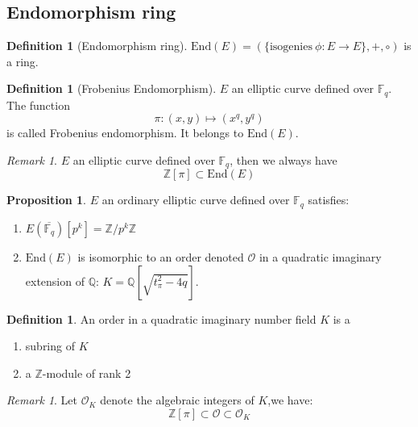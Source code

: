 \documentclass[10pt,a4paper]{beamer}
\theoremstyle{plain}
\theoremstyle{definition}
\theoremstyle{definition}
\theoremstyle{definition}
\newtheorem{prop}[thm]{Proposition}
\theoremstyle{definition}
\newtheorem{defi}[thm]{Definition}
\theoremstyle{remark}
\newtheorem{rem}[thm]{Remark}
\theoremstyle{remark}
\begin{document}
\begin{frame}
\section{Endomorphism ring}
\begin{defi}[Endomorphism ring]
$\mathrm{End}(E)=\left( \{ \mathrm{isogenies \  } \phi : E \rightarrow E \} ,+ ,\circ  \right)$ is a ring. %
\end{defi}

\begin{defi}[Frobenius Endomorphism]
$E$ an elliptic curve defined over $\mathbb{F}_q$. The function \[ \pi:(x,y) \mapsto (x^q,y^q)\] is called Frobenius endomorphism. It belongs to $\mathrm{End}(E)$.
\end{defi}

\begin{rem}
$E$ an elliptic curve defined over $\mathbb{F}_q$, then we always have \[ \mathbb{Z}[\pi] \subset  \mathrm{End}(E) \]
\end{rem}
\end{frame}


\begin{frame}
\begin{prop} \label{prop:p-tor}
$E$ an ordinary elliptic curve defined over $\mathbb{F}_q$ satisfies:
\begin{enumerate}
\item $E(\overline{\mathbb{F}_q})[p^k]=\mathbb{Z}/p^k \mathbb{Z}$
\item  $\mathrm{End}(E)$ is isomorphic to an order denoted $\mathcal{O}$ in a quadratic imaginary extension of $\mathbb{Q}$: $K=\mathbb{Q}[\sqrt{t_{\pi}^2-4q}]$.
\end{enumerate}
\end{prop}


\begin{defi}
An order in a quadratic imaginary number field $K$ is a 
\begin{enumerate}
\item subring of $K$
\item a $\mathbb{Z}$-module of rank 2
\end{enumerate}
\end{defi}
\begin{rem}
Let $\mathcal{O}_K$ denote the algebraic integers of $K$,we have:
\[ \mathbb{Z}[\pi] \subset \mathcal{O} \subset \mathcal{O}_K \]
\end{rem}


\end{frame}
\end{document}
